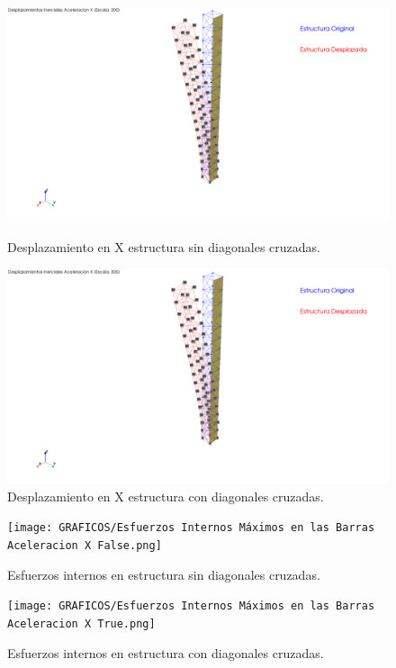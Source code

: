 \begin{figure}[H]
    \centering
    \begin{minipage}{0.45\textwidth}
        \centering
        \includegraphics[width=\textwidth]{GRAFICOS/Desplazamientos Inerciales Aceleracion X False.png}
        \caption{Desplazamiento en X estructura sin diagonales cruzadas.}
        \label{fig:imagen1}
    \end{minipage}
    \hfill
    \begin{minipage}{0.45\textwidth}
        \centering
        \includegraphics[width=\textwidth]{GRAFICOS/Desplazamientos Inerciales Aceleracion X True.png}
        \caption{Desplazamiento en X estructura con diagonales cruzadas.}
        \label{fig:imagen2}
    \end{minipage}
\end{figure}

\begin{figure}[H]
    \centering
    \begin{minipage}{0.45\textwidth}
        \centering
        \texttt{[image: GRAFICOS/Esfuerzos Internos Máximos en las Barras Aceleracion X False.png]}
        \caption{Esfuerzos internos en estructura sin diagonales cruzadas.}
        \label{fig:imagen11}
    \end{minipage}
    \hfill
    \begin{minipage}{0.45\textwidth}
        \centering
        \texttt{[image: GRAFICOS/Esfuerzos Internos Máximos en las Barras Aceleracion X True.png]}
        \caption{Esfuerzos internos en estructura con diagonales cruzadas.}
        \label{fig:imagen22}
    \end{minipage}
\end{figure}

